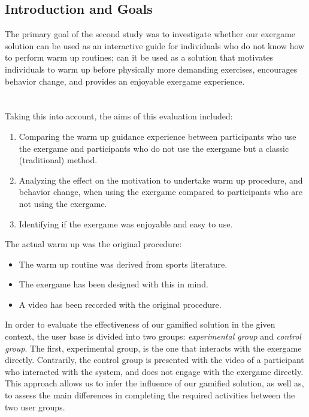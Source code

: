 \subsection{Introduction and Goals} \label{chapter:goals}
The primary goal of the second study was to investigate whether our exergame solution can be used as an interactive guide for individuals who do not know how to perform warm up routines; can it be used as a solution that motivates individuals to warm up before physically more demanding exercises, encourages behavior change, and provides an enjoyable exergame experience. \\\\\\Taking this into account, the aims of this evaluation included: 
\begin{enumerate}
\item Comparing the warm up guidance experience between participants who use the exergame and participants who do not use the exergame but a classic (traditional) method.
\item Analyzing the effect on the motivation to undertake warm up procedure, and behavior change, when using the exergame compared to participants who are not using the exergame.
\item Identifying if the exergame was enjoyable and easy to use.
\end{enumerate}
The actual warm up was the original procedure:  
\begin{itemize}
\item The warm up routine was derived from sports literature.
\item The exergame has been designed with this in mind.
\item A video has been recorded with the original procedure.
\end{itemize}
In order to evaluate the effectiveness of our gamified solution in the given context, the user base is divided into two groups: \textit{experimental group} and \textit{control group}. The first, experimental group, is the one that interacts with the exergame directly. Contrarily, the control group is presented with the video of a participant who interacted with the system, and does not engage with the exergame directly. This approach allows us to infer the influence of our gamified solution, as well as, to assess the main differences in completing the required activities between the two user groups. 
